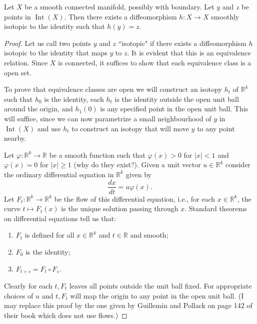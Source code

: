 \documentclass[a4paper]{scrartcl}
\begin{document}
\begin{lemma}
    Let $X$ be a smooth connected manifold, possibly with boundary. Let $y$ and $z$ be points in $\operatorname{Int}(X)$. Then there exists a diffeomorphism $h: X \rightarrow X$ smoothly isotopic to the identity such that $h(y)=z$. 
\end{lemma}
\begin{proof}
    Let us call two points $y$ and $z$ ``isotopic" if there exists a diffeomorphism $h$ isotopic to the identity that maps $y$ to $z$. It is evident that this is an equivalence relation. Since $X$ is connected, it suffices to show that each equivalence class is a open set.

To prove that equivalence classes are open we will construct an isotopy $h_{t}$ of $\mathbb{R}^{k}$ such that $h_{0}$ is the identity, each $h_{t}$ is the identity outside the open unit ball around the origin, and $h_{1}(0)$ is any specified point in the open unit ball. This will suffice, since we can now parametrize a small neighbourhood of $y$ in $\operatorname{Int}(X)$ and use $h_{t}$ to construct an isotopy that will move $y$ to any point nearby.

Let $\varphi: \mathbb{R}^{k} \rightarrow \mathbb{R}$ be a smooth function such that $\varphi(x)>0$ for $|x|<1$ and $\varphi(x)=0$ for $|x| \geq 1$ (why do they exist?). Given a unit vector $u \in \mathbb{R}^{k}$ consider the ordinary differential equation in $\mathbb{R}^{k}$ given by
$$
\frac{d x}{d t}=u \varphi(x).
$$
Let $F_{t}: \mathbb{R}^{k} \rightarrow \mathbb{R}^{k}$ be the flow of this differential equation, i.e., for each $x \in \mathbb{R}^{k}$, the curve $t \mapsto F_{t}(x)$ is the unique solution passing through $x$. Standard theorems on differential equations tell us that:
\begin{enumerate}
    \item $F_{t}$ is defined for all $x \in \mathbb{R}^{k}$ and $t \in \mathbb{R}$ and smooth;
    \item $F_{0}$ is the identity;
    \item $F_{t+s}=F_{t} \circ F_{s}$.
\end{enumerate}

Clearly for each $t, F_{t}$ leaves all points outside the unit ball fixed. For appropriate choices of $u$ and $t, F_{t}$ will map the origin to any point in the open unit ball.
(I may replace this proof by the one given by Guillemin and Pollack on page 142 of their book which does not use flows.)
\end{proof}
\end{document}
